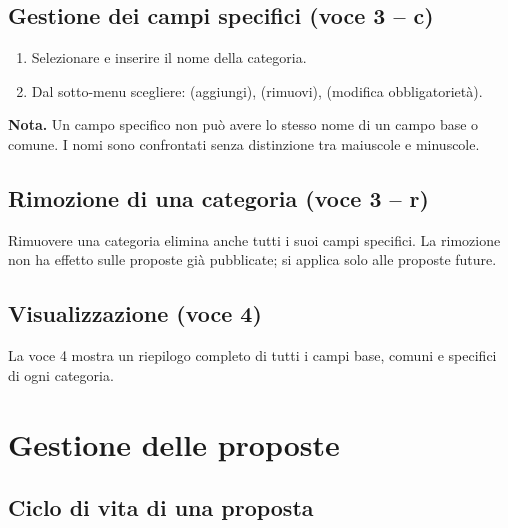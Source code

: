 \documentclass[12pt,a4paper,oneside]{report}
\newcommand{\tasto}[1]{\fbox{\small\ttfamily#1}}
\begin{document}
\subsection{Gestione dei campi specifici (voce 3 -- c)}
\begin{enumerate}
  \item Selezionare \tasto{c} e inserire il nome della categoria.
  \item Dal sotto-menu scegliere: \tasto{a} (aggiungi), \tasto{r} (rimuovi), \tasto{m} (modifica obbligatorietà).
\end{enumerate}

\begin{notabox}
\textbf{Nota.} Un campo specifico non può avere lo stesso nome di un campo base o comune. I nomi sono confrontati senza distinzione tra maiuscole e minuscole.
\end{notabox}

\subsection{Rimozione di una categoria (voce 3 -- r)}
Rimuovere una categoria elimina anche tutti i suoi campi specifici. La rimozione non ha effetto sulle proposte già pubblicate; si applica solo alle proposte future.

\subsection{Visualizzazione (voce 4)}
La voce 4 mostra un riepilogo completo di tutti i campi base, comuni e specifici di ogni categoria.

\section{Gestione delle proposte}
\label{sec:proposte}

\subsection{Ciclo di vita di una proposta}
\end{document}
